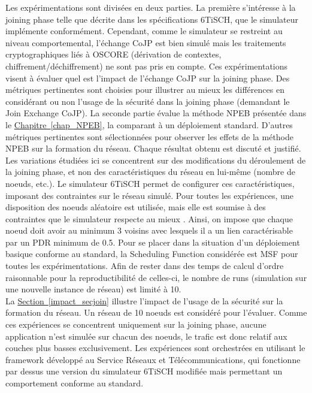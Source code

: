\documentclass[]{report}
\newcommand{\wordlink}[2]{\hyperref[#2]{#1~\ref{#2}}}
\begin{document}
Les expérimentations sont divisées en deux parties. La première s'intéresse à la joining phase telle que décrite dans les spécifications 6TiSCH, que le simulateur implémente conformément. Cependant, comme le simulateur se restreint au niveau comportemental, l'échange CoJP est bien simulé mais les traitements cryptographiques liés à OSCORE (dérivation de contextes, chiffrement/déchiffrement) ne sont pas pris en compte. Ces expérimentations visent à évaluer quel est l'impact de l'échange CoJP sur la joining phase. Des métriques pertinentes sont choisies pour illustrer au mieux les différences en considérant ou non l'usage de la sécurité dans la joining phase (demandant le Join Exchange CoJP). La seconde partie évalue la méthode NPEB présentée dans le \wordlink{Chapitre}{chap_NPEB}, la comparant à un déploiement standard. D'autres métriques pertinentes sont sélectionnées pour observer les effets de la méthode NPEB sur la formation du réseau. Chaque résultat obtenu est discuté et justifié.\\

Les variations étudiées ici se concentrent sur des modifications du déroulement de la joining phase, et non des caractéristiques du réseau en lui-même (nombre de noeuds, etc.). Le simulateur 6TiSCH permet de configurer ces caractéristiques, imposant des contraintes sur le réseau simulé. Pour toutes les expériences, une disposition des noeuds aléatoire est utilisée, mais elle est soumise à des contraintes que le simulateur respecte au mieux \cite{simulating-6TiSCH}. Ainsi, on impose que chaque noeud doit avoir au minimum 3 voisins avec lesquels il a un lien caractérisable par un PDR minimum de 0.5. Pour se placer dans la situation d'un déploiement basique conforme au standard, la Scheduling Function considérée est MSF pour toutes les expérimentations. Afin de rester dans des temps de calcul d'ordre raisonnable pour la reproductibilité de celles-ci, le nombre de runs (simulation sur une nouvelle instance de réseau) est limité à 10.\\

La \wordlink{Section}{impact_secjoin} illustre l'impact de l'usage de la sécurité sur la formation du réseau. Un réseau de 10 noeuds est considéré pour l'évaluer. Comme ces expériences se concentrent uniquement sur la joining phase, aucune application n'est simulée sur chacun des noeuds, le trafic est donc relatif aux couches plus basses exclusivement. Les expériences sont orchestrées en utilisant le framework développé au Service Réseaux et Télécommunications, qui fonctionne par dessus une version du simulateur 6TiSCH modifiée mais permettant un comportement conforme au standard.\\
\end{document}
